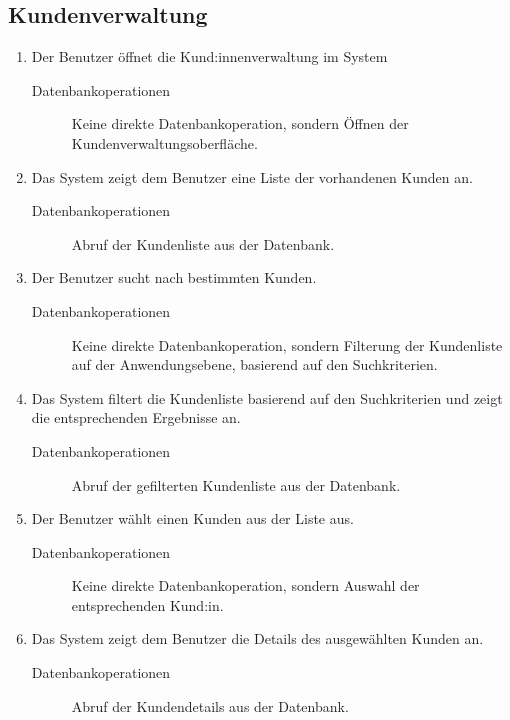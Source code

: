 \subsection{Kundenverwaltung}
\begin{enumerate}
    \item Der Benutzer öffnet die Kund:innenverwaltung im System
        \begin{description}
            \item[Datenbankoperationen] Keine direkte Datenbankoperation, sondern Öffnen der
            Kundenverwaltungsoberfläche.
        \end{description}
    \item Das System zeigt dem Benutzer eine Liste der vorhandenen Kunden an.
        \begin{description}
            \item[Datenbankoperationen] Abruf der Kundenliste aus der Datenbank.
        \end{description}
    \item Der Benutzer sucht nach bestimmten Kunden.
        \begin{description}
            \item[Datenbankoperationen] Keine direkte Datenbankoperation, sondern Filterung der Kundenliste auf der
            Anwendungsebene, basierend auf den Suchkriterien.            
        \end{description}
    \item Das System filtert die Kundenliste basierend auf den Suchkriterien und zeigt die
    entsprechenden Ergebnisse an.
        \begin{description}
            \item[Datenbankoperationen] Abruf der gefilterten Kundenliste aus der Datenbank.
        \end{description}
    \item Der Benutzer wählt einen Kunden aus der Liste aus.
        \begin{description}
            \item[Datenbankoperationen] Keine direkte Datenbankoperation, sondern Auswahl der entsprechenden
            Kund:in.                    
        \end{description}
    \item Das System zeigt dem Benutzer die Details des ausgewählten Kunden an.
        \begin{description}
            \item[Datenbankoperationen] Abruf der Kundendetails aus der Datenbank.                        

\end{description}
\end{enumerate}
